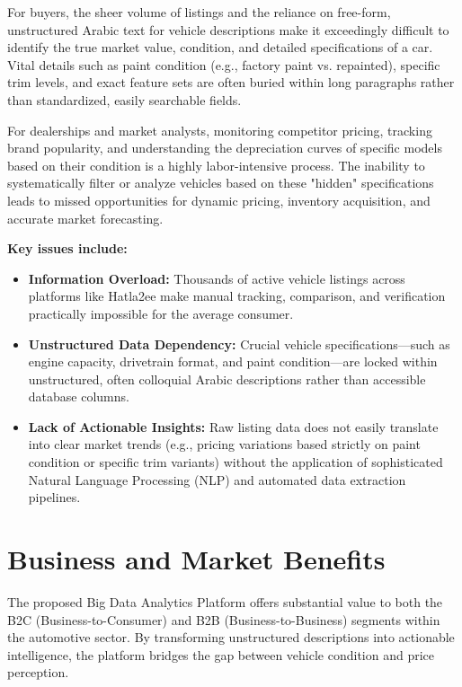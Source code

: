 \documentclass[12pt]{article}
\begin{document}
For buyers, the sheer volume of listings and the reliance on free-form, unstructured Arabic text for vehicle descriptions make it exceedingly difficult to identify the true market value, condition, and detailed specifications of a car. Vital details such as paint condition (e.g., factory paint vs. repainted), specific trim levels, and exact feature sets are often buried within long paragraphs rather than standardized, easily searchable fields.

For dealerships and market analysts, monitoring competitor pricing, tracking brand popularity, and understanding the depreciation curves of specific models based on their condition is a highly labor-intensive process. The inability to systematically filter or analyze vehicles based on these "hidden" specifications leads to missed opportunities for dynamic pricing, inventory acquisition, and accurate market forecasting.

\textbf{Key issues include:}
\begin{itemize}
    \item \textbf{Information Overload:} Thousands of active vehicle listings across platforms like Hatla2ee make manual tracking, comparison, and verification practically impossible for the average consumer.
    \item \textbf{Unstructured Data Dependency:} Crucial vehicle specifications—such as engine capacity, drivetrain format, and paint condition—are locked within unstructured, often colloquial Arabic descriptions rather than accessible database columns.
    \item \textbf{Lack of Actionable Insights:} Raw listing data does not easily translate into clear market trends (e.g., pricing variations based strictly on paint condition or specific trim variants) without the application of sophisticated Natural Language Processing (NLP) and automated data extraction pipelines.
\end{itemize}

\newpage
\section{Business and Market Benefits}

The proposed Big Data Analytics Platform offers substantial value to both the B2C (Business-to-Consumer) and B2B (Business-to-Business) segments within the automotive sector. By transforming unstructured descriptions into actionable intelligence, the platform bridges the gap between vehicle condition and price perception.
\end{document}

